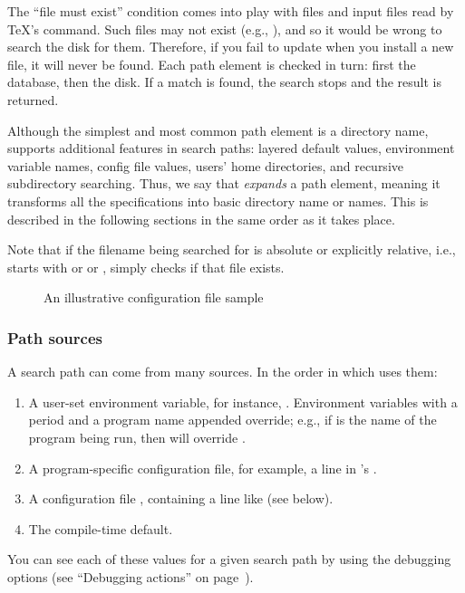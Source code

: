 \documentclass{article}
\begin{document}
The ``file must exist'' condition comes into play with  files and
input files read by \TeX's  command.  Such files may not
exist (e.g., ), and so it would be wrong to search the
disk for them.  Therefore, if you fail to update  when you
install a new  file, it will never be found.
Each path element is checked in turn: first the database, then the
disk.  If a match is found, the search stops and the result is
returned.

Although the simplest and most common path element is a directory
name, \KPS{} supports additional features in search paths: layered
default values, environment variable names, config file values, users'
home directories, and recursive subdirectory searching.  Thus, we say
that \KPS{} \emph{expands} a path element, meaning it transforms all
the specifications into basic directory name or names.  This is
described in the following sections in the same order as it takes
place.

Note that if the filename being searched for is absolute or explicitly
relative, i.e., starts with \samp{/} or  or ,
\KPS{} simply checks if that file exists.

\ifSingleColumn
\else
\begin{figure*}

\setlength{\abovecaptionskip}{0pt}
  \caption{An illustrative configuration file sample}
  \label{fig:config-sample}
\end{figure*}
\fi

\subsubsection{Path sources}
\label{Path-sources}

A search path can come from many sources.  In the order in which
\KPS{} uses them:

\begin{enumerate}
\item 
  A user-set environment variable, for instance, \@.
  Environment variables with a period and a program name appended
  override; e.g., if  is the name of the program being run,
  then  will override .
\item 
  A program-specific configuration file, for exam\-ple, a line
   in 's .
\item   A \KPS{} configuration file , containing a line like
   (see below).  
\item The compile-time default.
\end{enumerate} 
\noindent You can see each of these values for a given
search path by using the debugging options (see ``Debugging actions''
on page~\pageref{Debugging}).
\end{document}
